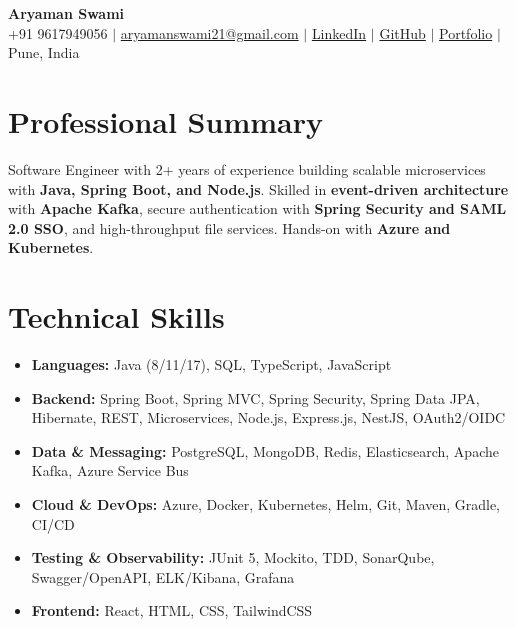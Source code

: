 \documentclass[letterpaper,10pt]{article}
\makeatletter
\newcommand{\resumeEmail}{aryamanswami21@gmail.com}
\makeatother
\begin{document}

\begin{center}
    {\Huge \textbf{Aryaman Swami}} \\ \vspace{3pt}
    \small
    +91 9617949056 $|$
    \href{mailto:\resumeEmail}{\resumeEmail} $|$
    \href{https://linkedin.com/in/aryaman-swami}
    {LinkedIn} $|$
    \href{https://github.com/Aryaman-Swami}
    {GitHub} $|$
    \href{https://aryaman-swami.netlify.app/}
    {Portfolio} $|$
    Pune, India
\end{center}

\vspace{-8pt}


\section{Professional Summary}

{\small
Software Engineer with 2+ years of experience building scalable
microservices with \textbf{Java, Spring Boot, and Node.js}. Skilled in
\textbf{event-driven architecture} with \textbf{Apache Kafka},
secure authentication with \textbf{Spring Security and SAML 2.0 SSO},
and high-throughput file services. Hands-on with \textbf{Azure and
Kubernetes}.
}


\section{Technical Skills}

\begin{itemize}[
    leftmargin=0.15in,
    label={},
    itemsep=1pt,
    parsep=0pt,
    topsep=2pt
]

\item \small{
\textbf{Languages:} Java (8/11/17), SQL, TypeScript, JavaScript
}

\item \small{
\textbf{Backend:} Spring Boot, Spring MVC, Spring Security, Spring Data JPA,
Hibernate, REST, Microservices, Node.js, Express.js, NestJS,
OAuth2/OIDC
}

\item \small{
\textbf{Data \& Messaging:} PostgreSQL, MongoDB, Redis,
Elasticsearch, Apache Kafka, Azure Service Bus
}

\item \small{
\textbf{Cloud \& DevOps:} Azure, Docker, Kubernetes, Helm,
Git, Maven, Gradle, CI/CD
}

\item \small{
\textbf{Testing \& Observability:} JUnit 5, Mockito, TDD,
SonarQube, Swagger/OpenAPI, ELK/Kibana, Grafana
}

\item \small{
\textbf{Frontend:} React, HTML, CSS, TailwindCSS
}

\end{itemize}
\end{document}
